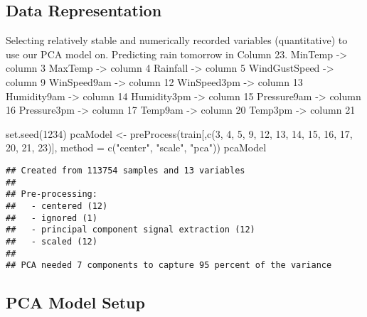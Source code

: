 \documentclass[
]{article}
\newenvironment{Shaded}{\begin{snugshade}}{\end{snugshade}}
\newcommand{\AttributeTok}[1]{\textcolor[rgb]{0.77,0.63,0.00}{#1}}
\newcommand{\DecValTok}[1]{\textcolor[rgb]{0.00,0.00,0.81}{#1}}
\newcommand{\FunctionTok}[1]{\textcolor[rgb]{0.00,0.00,0.00}{#1}}
\newcommand{\NormalTok}[1]{#1}
\newcommand{\OtherTok}[1]{\textcolor[rgb]{0.56,0.35,0.01}{#1}}
\newcommand{\StringTok}[1]{\textcolor[rgb]{0.31,0.60,0.02}{#1}}
\begin{document}
\hypertarget{data-representation}{%
\subsection{Data Representation}\label{data-representation}}

Selecting relatively stable and numerically recorded variables
(quantitative) to use our PCA model on. Predicting rain tomorrow in
Column 23. MinTemp -\textgreater{} column 3 MaxTemp -\textgreater{}
column 4 Rainfall -\textgreater{} column 5 WindGustSpeed -\textgreater{}
column 9 WinSpeed9am -\textgreater{} column 12 WinSpeed3pm
-\textgreater{} column 13 Humidity9am -\textgreater{} column 14
Humidity3pm -\textgreater{} column 15 Pressure9am -\textgreater{} column
16 Pressure3pm -\textgreater{} column 17 Temp9am -\textgreater{} column
20 Temp3pm -\textgreater{} column 21

\begin{Shaded}
\begin{Highlighting}[]
\FunctionTok{set.seed}\NormalTok{(}\DecValTok{1234}\NormalTok{)}
\NormalTok{pcaModel }\OtherTok{\textless{}{-}} \FunctionTok{preProcess}\NormalTok{(train[,}\FunctionTok{c}\NormalTok{(}\DecValTok{3}\NormalTok{, }\DecValTok{4}\NormalTok{, }\DecValTok{5}\NormalTok{, }\DecValTok{9}\NormalTok{, }\DecValTok{12}\NormalTok{, }\DecValTok{13}\NormalTok{, }\DecValTok{14}\NormalTok{, }\DecValTok{15}\NormalTok{, }\DecValTok{16}\NormalTok{, }\DecValTok{17}\NormalTok{, }\DecValTok{20}\NormalTok{, }\DecValTok{21}\NormalTok{, }\DecValTok{23}\NormalTok{)], }\AttributeTok{method =} \FunctionTok{c}\NormalTok{(}\StringTok{"center"}\NormalTok{, }\StringTok{"scale"}\NormalTok{, }\StringTok{"pca"}\NormalTok{))}
\NormalTok{pcaModel}
\end{Highlighting}
\end{Shaded}

\begin{verbatim}
## Created from 113754 samples and 13 variables
## 
## Pre-processing:
##   - centered (12)
##   - ignored (1)
##   - principal component signal extraction (12)
##   - scaled (12)
## 
## PCA needed 7 components to capture 95 percent of the variance
\end{verbatim}

\hypertarget{pca-model-setup}{%
\subsection{PCA Model Setup}\label{pca-model-setup}}
\end{document}

